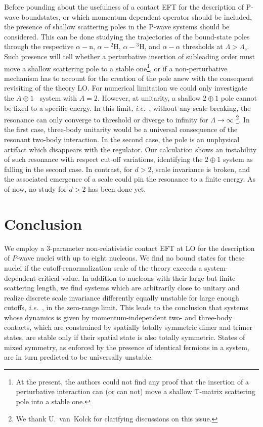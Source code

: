 \documentclass[preprint,12pt]{elsarticle}
\newcommand{\lc}{\ensuremath{\Lambda_c}}
\newcommand{\abb}{\mbox{\ensuremath{A\oplus 1}}}
\newcommand{\ie}{\textit{i.e.}~}
\begin{document}
%
Before pounding about the usefulness of a contact EFT for the description of P-wave boundstates, or which momentum dependent operator should be included, the presence of shallow scattering poles in the P-wave systems should be considered.
This can be done studying the trajectories of the bound-state poles through the respective $\alpha-\text{n}$, $\alpha-{}^2\text{H}$, $\alpha-{}^3\text{H}$, and $\alpha-\alpha$ thresholds at $\Lambda > \lc$.
Such presence will tell whether a perturbative insertion of subleading order must move a shallow scattering pole to a stable one\footnote{At the present, the authors could not find any proof that the insertion of a perturbative interaction can (or can not) move a shallow T-matrix scattering pole into a stable one.}, or if a non-perturbative mechanism has to account for the creation of the pole anew with the consequent revisiting of the theory LO.
For numerical limitation we could only investigate the \abb~ system with $A=2$.
However, at unitarity, a shallow $2\oplus1$ pole cannot be fixed to a specific energy.
In this limit, \ie, without any scale breaking, the resonance can only converge to threshold
or diverge to infinity for $\Lambda\to\infty$
\footnote{We thank U.~van~Kolck for clarifying discussions on this issue.}.
In the first case, three-body unitarity would be a universal consequence of the resonant two-body
interaction. 
In the second case, the pole is an unphysical artifact which disappears with the regulator.
Our calculation shows an instability of such resonance with respect cut-off variations, identifying the $2\oplus 1$ system as falling in the second case.
In contrast, for $d>2$, scale invariance is broken, and the associated emergence of a scale could pin the resonance to a finite energy.
As of now, no study for $d>2$ has been done yet.




\section*{Conclusion}

We employ a 3-parameter non-relativistic contact EFT at LO for the description of $P$-wave nuclei with up to eight nucleons.
We find no bound states for these nuclei if the cutoff-renormalization scale of the theory exceeds a system-dependent critical value.
In addition to nucleons with their large but finite scattering length, we find systems which are arbitrarily close to unitary and realize
discrete scale invariance differently equally unstable for large enough cutoffs, \ie, in the zero-range limit.
This leads to the conclusion that systems whose dynamics is given by momentum-independent two- and three-body contacts, which are
constrained by spatially totally symmetric dimer and trimer states, are stable only if their spatial state is also totally symmetric.
States of mixed symmetry, as enforced by the presence of identical fermions in a system, are in turn predicted to be universally unstable. 
\end{document}

